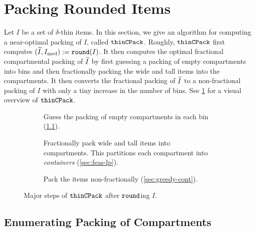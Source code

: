 \section{Packing Rounded Items}
\label{sec:thin-bp:algo}

Let $I$ be a set of $\delta$-thin items. In this section,
we give an algorithm for computing a near-optimal packing of $I$, called $\operatorname{\mathtt{thinCPack}}$.
Roughly, $\operatorname{\mathtt{thinCPack}}$ first computes $(\widetilde{I}, I_{\mathrm{med}}) := \operatorname{\mathtt{round}}(I)$.
It then computes the optimal fractional compartmental packing of $\widetilde{I}$
by first guessing a packing of empty compartments into bins
and then fractionally packing the wide and tall items into the compartments.
It then converts the fractional packing of $\widetilde{I}$ to a non-fractional packing of $I$
with only a tiny increase in the number of bins.
See \cref{fig:thincpack} for a visual overview of $\operatorname{\mathtt{thinCPack}}$.

\begin{figure}[htb]
\begin{subfigure}[t]{0.3\textwidth}
\centering
{}

\caption{Guess the packing of empty compartments in each bin (\cref{sec:enum-configs}).}
\end{subfigure}
\hfill
\begin{subfigure}[t]{0.3\textwidth}
\centering
{}

\caption{Fractionally pack wide and tall items into compartments.
This partitions each compartment into \emph{containers} (\cref{sec:feas-lp}).}
\end{subfigure}
\hfill
\begin{subfigure}[t]{0.3\textwidth}
\centering
{}

\caption{Pack the items non-fractionally (\cref{sec:greedy-cont}).}
\end{subfigure}
\caption{Major steps of $\operatorname{\mathtt{thinCPack}}$ after $\operatorname{\mathtt{round}}$ing $I$.}
\label{fig:thincpack}
\end{figure}

\subsection{Enumerating Packing of Compartments}
\label{sec:enum-configs}

